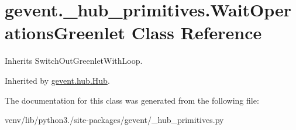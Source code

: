 \hypertarget{classgevent_1_1__hub__primitives_1_1_wait_operations_greenlet}{}\section{gevent.\+\_\+hub\+\_\+primitives.\+Wait\+Operations\+Greenlet Class Reference}
\label{classgevent_1_1__hub__primitives_1_1_wait_operations_greenlet}


Inherits Switch\+Out\+Greenlet\+With\+Loop.



Inherited by \hyperlink{classgevent_1_1hub_1_1_hub}{gevent.\+hub.\+Hub}.



The documentation for this class was generated from the following file\+:\begin{DoxyCompactItemize}
\item 
venv/lib/python3./site-\/packages/gevent/\+\_\+hub\+\_\+primitives.\+py\end{DoxyCompactItemize}
